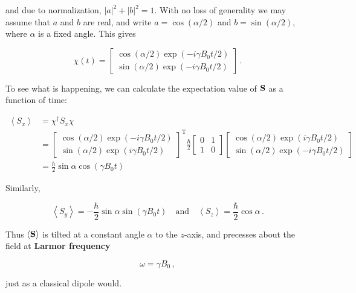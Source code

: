 \documentclass[12pt, titlepage]{article}
\newcommand{\exv}[1]{\left\langle #1 \right\rangle}
\newcommand{\Sx}{\begin{bmatrix} 0 & 1 \\ 1 & 0\end{bmatrix}}
\begin{document}
and due to normalization, $|a|^2 + |b|^2 = 1$. With no loss of generality we may assume that $a$ and $b$ are real, and write $a = \cos(\alpha/2)$ and $b = \sin(\alpha/2)$, where $\alpha$ is a fixed angle. This gives

\begin{equation}
	\chi(t) = \begin{bmatrix} \cos(\alpha/2) \exp(-i\gamma B_0 t/2) \\[4pt] \sin(\alpha/2) \exp(-i\gamma B_0 t/2) \end{bmatrix} \,.
\end{equation}

To see what is happening, we can calculate the expectation value of $\vb{S}$ as a function of time:

\begin{align*}
	\exv{S_x} &= \chi^\dagger S_x \chi \\[4pt]
	&= \begin{bmatrix} \cos(\alpha/2)\exp(-i\gamma B_0 t/2) \\[4pt] \sin(\alpha/2)\exp(i\gamma B_0 t/2) \end{bmatrix}^{\text{T}} \frac{\hbar}{2} \Sx \begin{bmatrix} \cos(\alpha/2)\exp(i\gamma B_0 t/2) \\[4pt] \sin(\alpha/2)\exp(-i\gamma B_0 t/2) \end{bmatrix} \\[4pt]
	&= \frac{\hbar}{2}\sin\alpha\cos(\gamma B_0 t)
\end{align*}

Similarly,

\begin{equation*}
	\exv{S_y} = -\frac{\hbar}{2}\sin\alpha\sin(\gamma B_0 t) \quad\text{and}\quad \exv{S_z} = \frac{\hbar}{2}\cos\alpha \,.
\end{equation*}

Thus $\exv{\vb{S}}$ is tilted at a constant angle $\alpha$ to the $z$-axis, and precesses about the field at \textbf{Larmor frequency}

\begin{equation}
	\omega = \gamma B_0 \,,
\end{equation}

just as a classical dipole would. 
\clearpage
\end{document}

